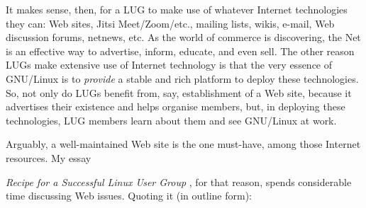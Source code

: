 \documentclass{HOWTO}
\begin{document}
It makes sense, then, for a LUG to make use of whatever Internet
technologies they can: Web sites, Jitsi Meet/Zoom/etc., mailing lists, 
wikis, e-mail, Web discussion forums, netnews, etc. As the world of commerce is
discovering, the Net is an effective way to advertise, inform, educate,
and even sell. The other reason LUGs make extensive use of Internet
technology is that the very essence of GNU/Linux is to {\itshape provide\/} a stable and rich platform to deploy these technologies. So,
not only do LUGs benefit from, say, establishment of a Web site,
because it advertises their existence and helps organise members,
but, in deploying these technologies, LUG members 
learn about them and see GNU/Linux at work.

Arguably, a well-maintained Web site is the one must-have, among those
Internet resources.  My essay

\emph{Recipe for a Successful Linux User Group} \texttt{\aduurl}
, for that reason,
spends considerable time discussing Web issues.  Quoting it (in outline form):
\end{document}
